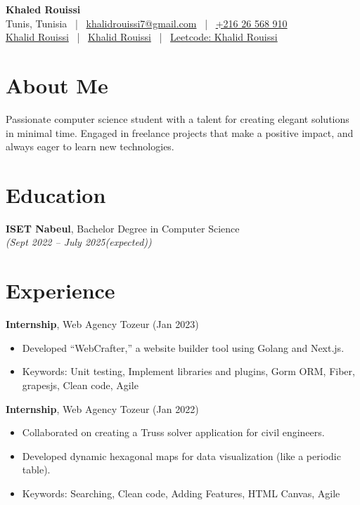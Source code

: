 \documentclass[11pt,letterpaper]{article}
\begin{document}
\begin{center}
    \Large\textbf{Khaled Rouissi}\\[0.2cm]
    \small
    Tunis, Tunisia \ | \ \href{mailto:khalidrouissi7@gmail.com}{khalidrouissi7@gmail.com} \ | \ \href{tel:+216-26-568-910}{+216 26 568 910}\\
    \href{https://linkedin.com/in/khalid-rouissi-6a136b242}{\faLinkedin Khalid Rouissi} \ | \ \href{https://github.com/KhalidRouissi1}{\faGithub Khalid Rouissi}
    \ | \ \href{https://leetcode.com/u/KhalidRouissi1/}{Leetcode: Khalid Rouissi}
\end{center}

\section{About Me}
Passionate computer science student with a talent for creating elegant solutions in minimal time. Engaged in freelance projects that make a positive impact, and always eager to learn new technologies.

\section{Education}
\textbf{ISET Nabeul}, Bachelor Degree in Computer Science \\
\textit{(Sept 2022 – July 2025(expected))}

\section{Experience}
\textbf{Internship}, Web Agency Tozeur (Jan 2023)
\begin{itemize}[leftmargin=*, itemsep=1pt]
    \item Developed “WebCrafter,” a website builder tool using Golang and Next.js.
    \item Keywords: Unit testing, Implement libraries and plugins, Gorm ORM, Fiber, grapesjs, Clean code, Agile
\end{itemize}

\textbf{Internship}, Web Agency Tozeur (Jan 2022)
\begin{itemize}[leftmargin=*, itemsep=1pt]
    \item Collaborated on creating a Truss solver application for civil engineers.
    \item Developed dynamic hexagonal maps for data visualization (like a periodic table).
    \item Keywords: Searching, Clean code, Adding Features, HTML Canvas, Agile
\end{itemize}
\end{document}
